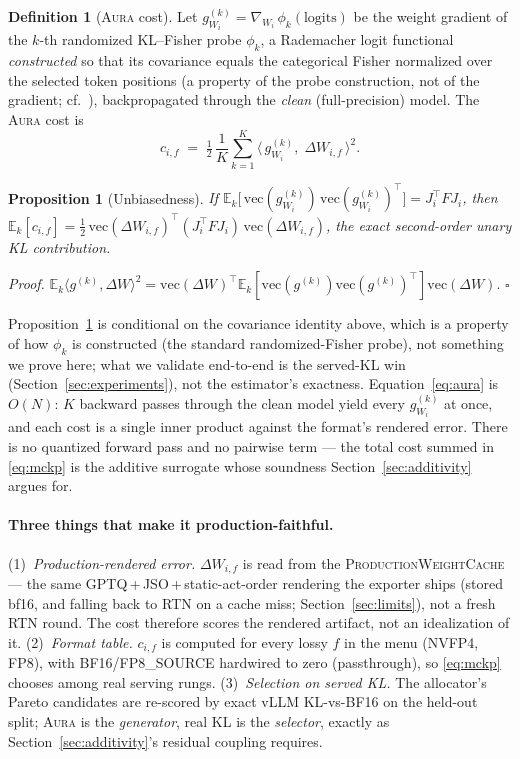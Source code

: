 \documentclass[11pt]{article}
\theoremstyle{plain}
\newtheorem{proposition}[theorem]{Proposition}
\theoremstyle{definition}
\newtheorem{definition}[theorem]{Definition}
\newcommand{\E}{\mathbb{E}}
\newcommand{\dW}{\Delta W}
\begin{document}
\begin{definition}[\textsc{Aura} cost]\label{def:aura}
Let $g^{(k)}_{W_i}=\nabla_{W_i}\,\phi_k(\text{logits})$ be the weight gradient of
the $k$-th randomized KL--Fisher probe $\phi_k$, a Rademacher logit functional
\emph{constructed} so that its covariance equals the categorical Fisher
normalized over the selected token positions (a property of the probe
construction, not of the gradient; cf.\ \cite{kllens2026}), backpropagated through
the \emph{clean} (full-precision) model. The \textsc{Aura} cost is
\begin{equation}\label{eq:aura}
  c_{i,f} \;=\; \tfrac12\,\frac{1}{K}\sum_{k=1}^{K}
     \big\langle\, g^{(k)}_{W_i},\; \dW_{i,f}\,\big\rangle^2 .
\end{equation}
\end{definition}

\begin{proposition}[Unbiasedness]\label{prop:unbiased}
If $\E_k\!\big[\,\mathrm{vec}(g^{(k)}_{W_i})\,\mathrm{vec}(g^{(k)}_{W_i})^\top\big]
= J_i^\top F J_i$, then $\E_k[c_{i,f}] = \tfrac12\,
\mathrm{vec}(\dW_{i,f})^\top(J_i^\top F J_i)\,\mathrm{vec}(\dW_{i,f})$, the exact
second-order unary KL contribution.
\end{proposition}

\noindent\emph{Proof.} $\E_k\langle g^{(k)},\dW\rangle^2
=\mathrm{vec}(\dW)^\top\E_k[\mathrm{vec}(g^{(k)})\mathrm{vec}(g^{(k)})^\top]
\mathrm{vec}(\dW)$. \hfill$\square$

\medskip
Proposition~\ref{prop:unbiased} is conditional on the covariance identity above,
which is a property of how $\phi_k$ is constructed (the standard randomized-Fisher
probe), not something we prove here; what we validate end-to-end is the served-KL
win (Section~\ref{sec:experiments}), not the estimator's exactness.
Equation~\eqref{eq:aura} is $O(N)$: $K$ backward passes through the clean model
yield every $g^{(k)}_{W_i}$ at once, and each cost is a single inner product
against the format's rendered error. There is no quantized forward pass and no
pairwise term --- the total cost summed in \eqref{eq:mckp} is the additive
surrogate whose soundness Section~\ref{sec:additivity} argues for.

\paragraph{Three things that make it production-faithful.}
(1)~\emph{Production-rendered error.} $\dW_{i,f}$ is read from the
\textsc{ProductionWeightCache} --- the same GPTQ\,+\,JSO\,+\,static-act-order
rendering the exporter ships (stored bf16, and falling back to RTN on a cache
miss; Section~\ref{sec:limits}), not a fresh RTN round. The cost therefore scores
the rendered artifact, not an idealization of it. (2)~\emph{Format table.}
$c_{i,f}$ is computed for every lossy $f$ in the menu (NVFP4, FP8), with
BF16/FP8\_SOURCE hardwired to zero (passthrough), so \eqref{eq:mckp} chooses
among real serving rungs. (3)~\emph{Selection on served KL.} The allocator's
Pareto candidates are re-scored by exact vLLM KL-vs-BF16 on the held-out split;
\textsc{Aura} is the \emph{generator}, real KL is the \emph{selector}, exactly as
Section~\ref{sec:additivity}'s residual coupling requires.
\end{document}

